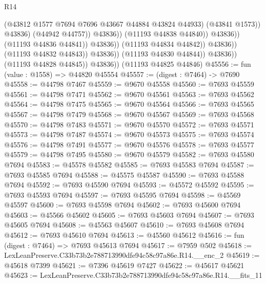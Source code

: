 \begin{lexlean}{R14}
\begin{coremodule}
                                                  (@43812
                                                    @1577
                                                    @7694
                                                    @7696
                                                    @43667
                                                    @44884
                                                    @43824
                                                    @44933)
                                                  (@43841 @1573))
                                                @43836)
                                              (@44942 @44757))
                                            @43836))
                                        (@11193 @44838 @44840))
                                      @43836))
                                  (@11193 @44836 @44841))
                                @43836))
                            (@11193 @44834 @44842))
                          @43836))
                      (@11193 @44832 @44843))
                    @43836))
                (@11193 @44830 @44844))
              @43836))
          (@11193 @44828 @44845))
        @43836))
    (@11193 @44825 @44846)
@45556 := fun (value : @1558) => @44820 @45554
@45557 := (digest : @7464) -> @7690
@45558 := @44798 @7467
@45559 := @9670 @45558
@45560 := @7693 @45559
@45561 := @44798 @7471
@45562 := @9670 @45561
@45563 := @7693 @45562
@45564 := @44798 @7475
@45565 := @9670 @45564
@45566 := @7693 @45565
@45567 := @44798 @7479
@45568 := @9670 @45567
@45569 := @7693 @45568
@45570 := @44798 @7483
@45571 := @9670 @45570
@45572 := @7693 @45571
@45573 := @44798 @7487
@45574 := @9670 @45573
@45575 := @7693 @45574
@45576 := @44798 @7491
@45577 := @9670 @45576
@45578 := @7693 @45577
@45579 := @44798 @7495
@45580 := @9670 @45579
@45582 := @7693 @45580 @7694
@45583 := @45578 @45582
@45585 := @7693 @45583 @7694
@45587 := @7693 @45585 @7694
@45588 := @45575 @45587
@45590 := @7693 @45588 @7694
@45592 := @7693 @45590 @7694
@45593 := @45572 @45592
@45595 := @7693 @45593 @7694
@45597 := @7693 @45595 @7694
@45598 := @45569 @45597
@45600 := @7693 @45598 @7694
@45602 := @7693 @45600 @7694
@45603 := @45566 @45602
@45605 := @7693 @45603 @7694
@45607 := @7693 @45605 @7694
@45608 := @45563 @45607
@45610 := @7693 @45608 @7694
@45612 := @7693 @45610 @7694
@45613 := @45560 @45612
@45616 := fun (digest : @7464) => @7693 @45613 @7694
@45617 := @7959 @502
@45618 := LexLeanPreserve.C33b73b2e788713990dfe94c58c97a86e.R14.__enc_2
@45619 := @45618 @7399
@45621 := @7396 @45619 @7427
@45622 := @45617 @45621
@45623 := LexLeanPreserve.C33b73b2e788713990dfe94c58c97a86e.R14.__fits_11

\end{coremodule}
\end{lexlean}
